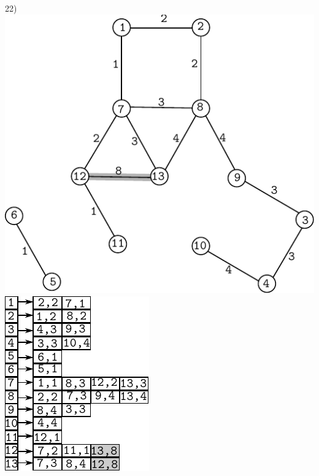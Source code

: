 \documentclass{article}
\begin{document}
\begin{center}
22)\includegraphics[scale=0.6]{bottleneck/g22}
\hspace{5mm}
\includegraphics[scale=0.9]{bottleneck/l22}
\end{center}
\end{document}
